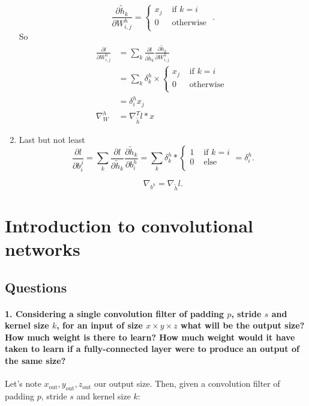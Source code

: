 \documentclass{article}
\theoremstyle{plain}%
\theoremstyle{definition}
\theoremstyle{remark}
\begin{document}
\begin{enumerate}
    \[
        \frac{\partial \tilde{h}_k}{\partial W^h_{i,j}} = \begin{cases}
            x_j &\text{ if } k = i\\
            0 &\text{ otherwise }\\
        \end{cases} 
    .\]
    So \begin{align*}
        \frac{\partial l}{\partial W^h _{i,j}} &= \sum_{k}^{} \frac{\partial l}{\partial \tilde{h}_k} \frac{\partial \tilde{h}_k}{\partial W^h_{i,j}} \\
            &= \sum_{k}^{}\delta ^h_k \times \begin{cases}
                x_j &\text{ if } k = i\\
                0 &\text{ otherwise }\\
            \end{cases} \\
            &= \delta _i^h x_j \\
        \nabla _W^h &= \nabla _{\tilde{h}} ^T l * x
    \end{align*}


    \item Last but not least 
    \[
        \frac{\partial l}{\partial b_i^j} = \sum_{k}^{} \frac{\partial l}{\partial \tilde{h}_k} \frac{\partial \tilde{h}_k}{\partial b_i^h} = \sum_{k}^{}\delta _k^h * \begin{cases}
            1 &\text{ if } k = i\\
            0 &\text{ else}\\
        \end{cases} = \delta ^h_i
    .\]
    
    \[
        \nabla _{b^h} = \nabla _{\tilde{h}} l
    .\]
    
\end{enumerate}

\newpage
\section{Introduction to convolutional networks}
\subsection{Questions}
\paragraph{1. Considering a single convolution filter of padding $p$, stride $s$ and kernel size $k$, for an input of size $x \times y \times z$ what will be the output size?
How much weight is there to learn?
How much weight would it have taken to learn if a fully-connected layer were to produce an output of the same size?} 
Let's note $x_{\text{out}}, y_{\text{out}}, z_{\text{out}}$ our output size. Then, given a convolution filter of padding $p$, stride $s$ and kernel size $k$:
\end{document}
